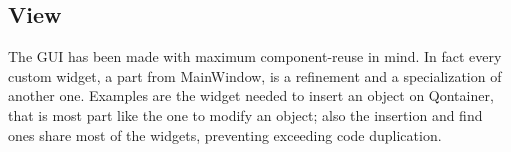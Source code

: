 \subsection{View}

The GUI has been made with maximum component-reuse in mind. In fact every custom widget, a part from MainWindow, is a refinement and a specialization of another one. Examples are the widget needed to insert an object on Qontainer, that is most part like the one to modify an object; also the insertion and find ones share most of the widgets, preventing exceeding code duplication.

